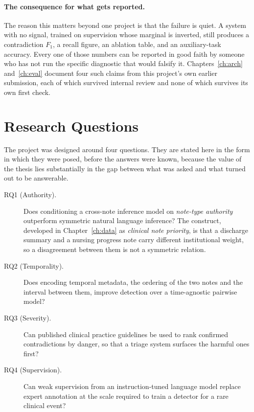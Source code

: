 \paragraph{The consequence for what gets reported.} The reason this matters
beyond one project is that the failure is quiet. A system with no signal, trained
on supervision whose marginal is inverted, still produces a contradiction
$F_1$, a recall figure, an ablation table, and an auxiliary-task accuracy. Every
one of those numbers can be reported in good faith by someone who has not run
the specific diagnostic that would falsify it. Chapters~\ref{ch:arch}
and~\ref{ch:eval} document four such claims from this project's own earlier
submission, each of which survived internal review and none of which survives
its own first check.

\section{Research Questions}
\label{sec:intro-rqs}

The project was designed around four questions. They are stated here in the
form in which they were posed, before the answers were known, because the value
of the thesis lies substantially in the gap between what was asked and what
turned out to be answerable.

\begin{description}
\item[RQ1 (Authority).] Does conditioning a cross-note inference model on
      \emph{note-type authority} outperform symmetric natural language
      inference? The construct, developed in Chapter~\ref{ch:data} as
      \emph{clinical note priority}, is that a discharge summary and a nursing
      progress note carry different institutional weight, so a disagreement
      between them is not a symmetric relation.
\item[RQ2 (Temporality).] Does encoding temporal metadata, the ordering of the
      two notes and the interval between them, improve detection over a
      time-agnostic pairwise model?
\item[RQ3 (Severity).] Can published clinical practice guidelines be used to
      rank confirmed contradictions by danger, so that a triage system surfaces
      the harmful ones first?
\item[RQ4 (Supervision).] Can weak supervision from an instruction-tuned
      language model replace expert annotation at the scale required to train a
      detector for a rare clinical event?
\end{description}

